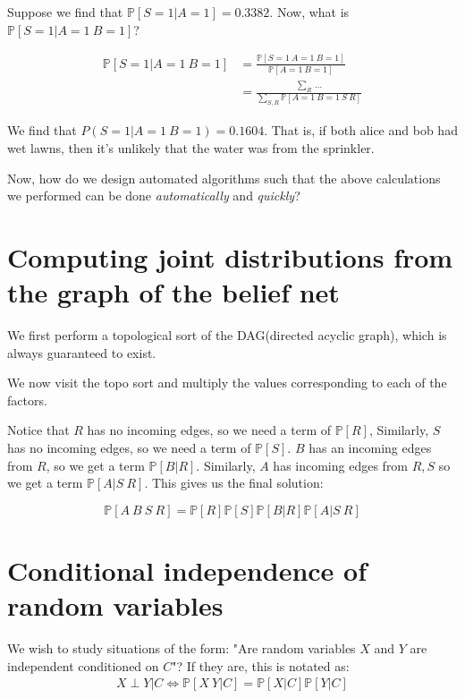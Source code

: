 \documentclass[11pt]{book}
\renewcommand{\P}[1]{\ensuremath{\mathbb{P} \left[ #1 \right]}}
\begin{document}
Suppose we find that $\P{S=1|A=1} = 0.3382$. Now, what is $\P{S=1|A=1~B=1}$?

\begin{align*}
\P{S=1|A=1~B=1} &= \frac{\P{S=1~A=1~B=1}}{\P{A=1~B=1}} \\
&= \frac{\sum_{R~} \dots} {\sum_{S, R} \P{A=1~B=1~S~R}}
\end{align*}

We find that $P(S=1|A=1~B=1) = 0.1604$. That is, if both alice and bob
had wet lawns, then it's unlikely that the water was from the sprinkler.

Now, how do we design automated algorithms such that the above calculations
we performed can be done \emph{automatically} and \emph{quickly}?

\section{Computing joint distributions from the graph of the belief net}

\begin{tikzpicture}
\end{tikzpicture}

We first perform a topological sort of the DAG(directed acyclic graph), which
is always guaranteed to exist.

\begin{tikzpicture}
    
\end{tikzpicture}

We now visit the topo sort and multiply the values corresponding to each
of the factors.

Notice that $R$ has no incoming edges, so we need a term of $\P{R}$, 
Similarly, $S$ has no incoming edges, so we need a term of $\P{S}$.
$B$ has an incoming edges from $R$, so we get a term $\P{B|R}$. Similarly, $A$
has incoming edges from $R, S$ so we get a term $\P{A|S~ R}$. This
gives us the final solution:

$$\P{A~B~S~R} = \P{R}\P{S}\P{B|R}\P{A|S~R}$$

\section{Conditional independence of random variables}

We wish to study situations of the form:
"Are random variables $X$ and $Y$ are independent conditioned on $C$"? 
If they are, this is notated as:
\begin{align*}
    X \perp Y | C \iff \P{X~ Y|C} = \P{X|C} \P{Y|C}
\end{align*}
\end{document}
